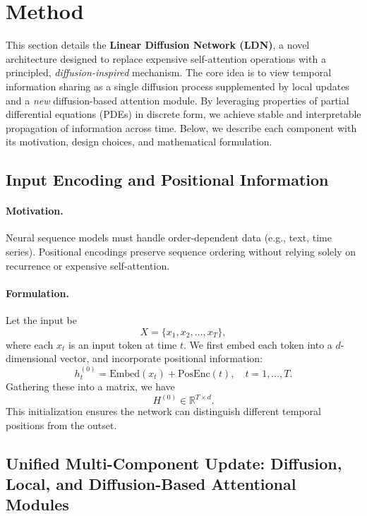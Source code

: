 \section{Method}\label{sec:method}

This section details the \textbf{Linear Diffusion Network (LDN)}, a novel architecture designed to replace expensive self-attention operations with a principled, \emph{diffusion-inspired} mechanism. The core idea is to view temporal information sharing as a single diffusion process supplemented by local updates and a \emph{new} diffusion-based attention module. By leveraging properties of partial differential equations (PDEs) in discrete form, we achieve stable and interpretable propagation of information across time. Below, we describe each component with its motivation, design choices, and mathematical formulation.

\subsection{Input Encoding and Positional Information}
\paragraph{Motivation.} 
Neural sequence models must handle order-dependent data (e.g., text, time series). Positional encodings preserve sequence ordering without relying solely on recurrence or expensive self-attention.

\paragraph{Formulation.}
Let the input be
\[
X = \{x_1, x_2, \dots, x_T\},
\]
where each \(x_t\) is an input token at time \(t\). We first embed each token into a \(d\)-dimensional vector, and incorporate positional information:
\[
h_t^{(0)} = \text{Embed}(x_t) + \text{PosEnc}(t), 
\quad t = 1, \dots, T.
\]
Gathering these into a matrix, we have
\[
H^{(0)} \in \mathbb{R}^{T \times d}.
\]
This initialization ensures the network can distinguish different temporal positions from the outset.

\subsection{Unified Multi-Component Update: Diffusion, Local, and Diffusion-Based Attentional Modules}
